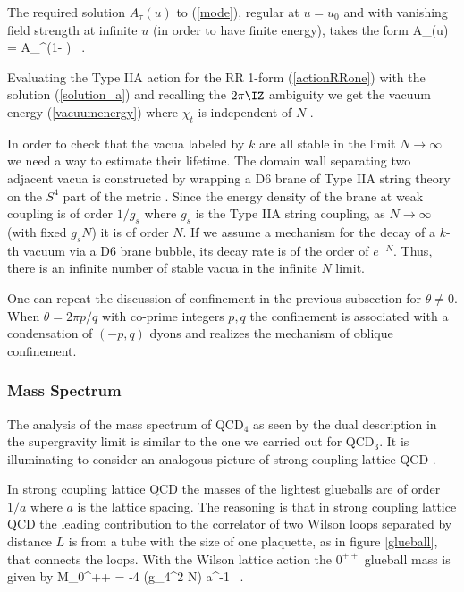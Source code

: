 The required solution $A_{\tau}(u)$ to (\ref{mode}), regular at $u=u_0$ and 
with vanishing field strength
at infinite $u$ (in order to have finite energy), takes the form 
\beq
A_{\tau}(u) = A_{\tau}^{\infty}(1- ) \ .
\label{solution_a}
\eeq

   

Evaluating the Type IIA action for the RR 1-form
(\ref{actionRRone}) 
with the solution (\ref{solution_a}) and recalling the $2 \pi 
\IZ$ ambiguity
we get the vacuum energy (\ref{vacuumenergy})
where $\chi_t$ is independent of $N$ \cite{Witten:1998td}.


In order to check that the vacua labeled by $k$ are all stable in the
limit $N\rightarrow \infty$ we need a way to estimate their lifetime.
The domain wall separating two adjacent vacua is constructed by
wrapping a D6 brane of Type IIA string theory on the $S^4$ part of the
metric \cite{Witten:1998td}.  Since the energy density of the brane at
weak coupling is of order $1/g_s$ where $g_s$ is the Type IIA
string coupling, as $N \rightarrow \infty$ (with fixed $g_s N$)
it is of order $N$. If we
assume a mechanism for the decay of a $k$-th vacuum via a D6 brane
bubble, its decay rate is of the order of $e^{-N}$.  Thus, there is an
infinite number of stable vacua in the infinite $N$ limit.
 
One can repeat the discussion of confinement in the previous subsection
for $\theta \neq 0$.
When $\theta = 2 \pi p/q$ with co-prime integers $p,q$ the confinement is
associated with a condensation of $(-p,q)$ dyons and realizes the
mechanism of oblique confinement.

\subsubsection{Mass Spectrum}

The analysis of the mass spectrum of QCD$_4$ as seen by  the dual
description in the supergravity limit is similar to the one we carried
out for QCD$_3$.
It is illuminating to consider an analogous picture of 
strong coupling lattice QCD \cite{Gross:1998gk}.

In strong coupling lattice QCD
the masses of the lightest glueballs 
are of order $1/a$ where $a$ is the lattice spacing.
The reasoning is that in strong coupling lattice
QCD the leading contribution to the correlator of
two Wilson loops separated by distance $L$
is from a tube with the size of one plaquette, as in figure \ref{glueball},
that connects the loops. 
With the Wilson lattice action the $0^{++}$ glueball mass is given by 
\cite{Creutz:1987xx}
\beq
M_{0^{++}}  =  -4 \log(g_{4}^2 N) a^{-1} \ .
\label{lattice}
\eeq


